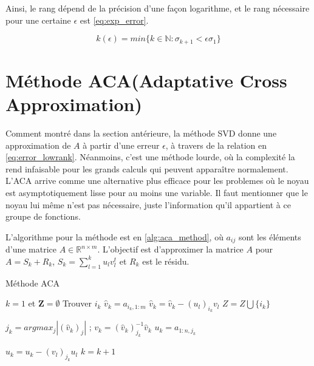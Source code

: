 \documentclass[a4paper, 15pt]{report}
\newcommand{\norm}[1]{\left\lVert#1\right\rVert}
\begin{document}
    Ainsi, le rang dépend de la précision d'une façon logarithme, et le rang nécessaire pour une certaine $\epsilon$ est \ref{eq:exp_error}.

    \begin{equation}\label{eq:exp_error}
        k(\epsilon) = min\{ k \in \mathbb{N} : \sigma_{k+1} < \epsilon\sigma_{1}\}
    \end{equation}

    \section{Méthode ACA(Adaptative Cross Approximation)}

    Comment montré dans la section antérieure, la méthode SVD donne une approximation de $A$ à partir d'une erreur $\epsilon$, à travers de la relation en \ref{eq:error_lowrank}. Néanmoins, c'est une méthode lourde, où la complexité la rend infaisable pour les grands calculs qui peuvent apparaître normalement. L'ACA arrive comme une alternative plus efficace pour les problemes où le noyau est asymptotiquement lisse pour au moins une variable. Il faut mentionner que le noyau lui même n'est pas nécessaire, juste l'information qu'il appartient à ce groupe de fonctions.
    
    
    L'algorithme pour la méthode est en \ref{alg:aca_method}, où $a_{ij}$ sont les éléments d'une matrice $A \in \mathbb{R}^{n\times m}$. L'objectif est d'approximer la matrice $A$ pour $A=S_{k} + R_{k}$, $S_{k} = \sum_{l=1}^{k} u_{l}v_{l}^{t}$ et $R_{k}$ est le résidu.


    \begin{algorithm}
    \caption{Méthode ACA}\label{alg:aca_method}
    \begin{algorithmic}[1]
    \State $k=1$ et $\mathbf{Z} = \emptyset $
    \Repeat
    \State Trouver $i_{k}$
    \State $\hat{v}_{k} = a_{i_{k},1:m} $
    \State $\hat{v}_{k} = \hat{v}_{k} - (u_{l})_{i_{k}}v_{l} $
    \EndFor
    \State $Z = Z \bigcup \{ i_{k} \} $

    \State $j_{k} = argmax_{j}|(\hat{v}_{k})_{j}|$ ; $v_{k} = (\hat{v}_{k})^{-1}_{j_{k}} \hat{v}_{k}$
    \State $u_{k}=a_{1:n,j_{k}}$

    \State $u_{k}=u_{k} - (v_{l})_{j_{k}}u_{l}$
    \EndFor
    \State $k=k+1$
    
    \EndIf

    
    \Until{$\norm{u_{k}}\norm{v_{k}} \leq \epsilon$}
    
    \end{algorithmic}
    \end{algorithm}
    
\end{document}
